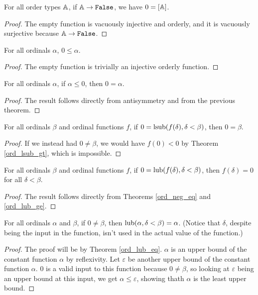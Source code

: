 \documentclass[../../math.tex]{subfiles}
\begin{document}
\begin{theorem} \label{ord_false_0}
    For all order types $\mathbb{A}$, if $\A \to \False$, we have $0 = [\mathbb{A}]$.
\end{theorem}
\begin{proof}
    The empty function is vacuously injective and orderly, and it is vacuously
    surjective because $\A \to \False$.
\end{proof}

\begin{theorem} \label{ord_pos} \label{ord_pos2}
    For all ordinals $\alpha$, $0 \leq \alpha$.
\end{theorem}
\begin{proof}
    The empty function is trivially an injective orderly function.
\end{proof}

\begin{theorem} \label{ord_neg_eq}
    For all ordinals $\alpha$, if $\alpha \leq 0$, then $0 = \alpha$.
\end{theorem}
\begin{proof}
    The result follows directly from antisymmetry and from the previous theorem.
\end{proof}

\begin{theorem} \label{ord_lsub_f_zero}
    For all ordinals $\beta$ and ordinal functions $f$, if $0 = \operatorname{lsub}(f(\delta),
    \delta < \beta)$, then $0 = \beta$.
\end{theorem}
\begin{proof}
    If we instead had $0 \neq \beta$, we would have $f(0) < 0$ by Theorem
    \ref{ord_lsub_gt}, which is impossible.
\end{proof}

\begin{theorem} \label{ord_lub_f_zero}
    For all ordinals $\beta$ and ordinal functions $f$, if $0 = \operatorname{lub}(f(\delta),
    \delta < \beta)$, then $f(\delta) = 0$ for all $\delta < \beta$.
\end{theorem}
\begin{proof}
    The result follows directly from Theorems \ref{ord_neg_eq} and
    \ref{ord_lub_ge}.
\end{proof}

\begin{theorem} \label{ord_lub_constant}
    For all ordinals $\alpha$ and $\beta$, if $0 \neq \beta$, then $\operatorname{lub}(\alpha,
    \delta < \beta) = \alpha$.  (Notice that $\delta$, despite being the input
    in the function, isn't used in the actual value of the function.)
\end{theorem}
\begin{proof}
    The proof will be by Theorem \ref{ord_lub_eq}.  $\alpha$ is an upper bound
    of the constant function $\alpha$ by reflexivity.  Let $\varepsilon$ be
    another upper bound of the constant function $\alpha$.  $0$ is a valid input
    to this function because $0 \neq \beta$, so looking at $\varepsilon$ being
    an upper bound at this input, we get $\alpha \leq \varepsilon$, showing
    thath $\alpha$ is the least upper bound.
\end{proof}
\end{document}
